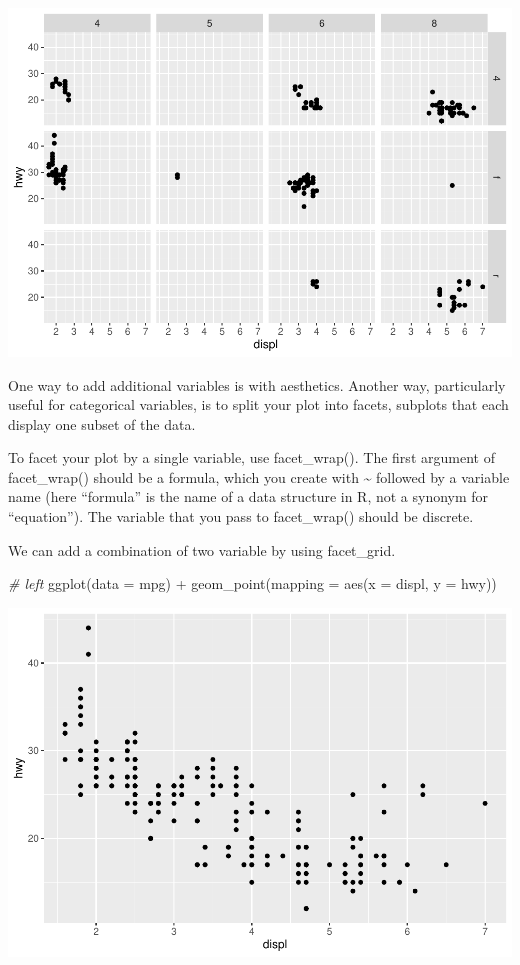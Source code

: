 \documentclass[
]{article}
\newenvironment{Shaded}{\begin{snugshade}}{\end{snugshade}}
\newcommand{\AttributeTok}[1]{\textcolor[rgb]{0.77,0.63,0.00}{#1}}
\newcommand{\CommentTok}[1]{\textcolor[rgb]{0.56,0.35,0.01}{\textit{#1}}}
\newcommand{\FunctionTok}[1]{\textcolor[rgb]{0.00,0.00,0.00}{#1}}
\newcommand{\NormalTok}[1]{#1}
\newcommand{\SpecialCharTok}[1]{\textcolor[rgb]{0.00,0.00,0.00}{#1}}
\begin{document}
\includegraphics{Journal_files/figure-latex/unnamed-chunk-46-2.pdf}

One way to add additional variables is with aesthetics. Another way,
particularly useful for categorical variables, is to split your plot
into facets, subplots that each display one subset of the data.

To facet your plot by a single variable, use facet\_wrap(). The first
argument of facet\_wrap() should be a formula, which you create with
\textasciitilde{} followed by a variable name (here ``formula'' is the
name of a data structure in R, not a synonym for ``equation''). The
variable that you pass to facet\_wrap() should be discrete.

We can add a combination of two variable by using facet\_grid.

\begin{Shaded}
\begin{Highlighting}[]
\CommentTok{\# left}
\FunctionTok{ggplot}\NormalTok{(}\AttributeTok{data =}\NormalTok{ mpg) }\SpecialCharTok{+} 
  \FunctionTok{geom\_point}\NormalTok{(}\AttributeTok{mapping =} \FunctionTok{aes}\NormalTok{(}\AttributeTok{x =}\NormalTok{ displ, }\AttributeTok{y =}\NormalTok{ hwy))}
\end{Highlighting}
\end{Shaded}

\includegraphics{Journal_files/figure-latex/unnamed-chunk-47-1.pdf}
\end{document}
